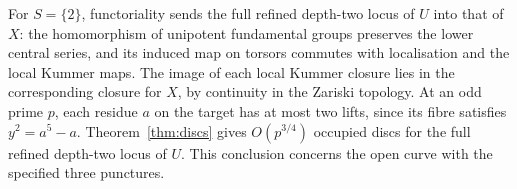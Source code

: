 For $S=\{2\}$, functoriality sends the full refined depth-two locus of
$U$ into that of $X$: the homomorphism of unipotent fundamental groups
preserves the lower central series, and its induced map on torsors
commutes with localisation and the local Kummer maps. The image of
each local Kummer closure lies in the corresponding closure for $X$,
by continuity in the Zariski topology. At an odd prime $p$, each
residue $a$ on the target has at most two lifts, since its fibre
satisfies $y^2=a^5-a$. Theorem~\ref{thm:discs} gives
$O(p^{3/4})$ occupied discs for the full refined depth-two locus
of $U$. This conclusion concerns the open curve with the specified
three punctures.
